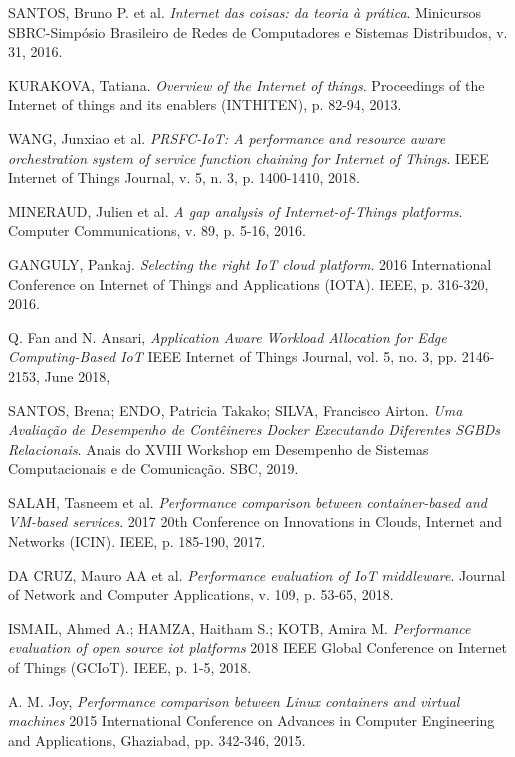 \documentclass{sbrt}
\begin{document}
\begin{thebibliography}{99}
 SANTOS, Bruno P. et al. \textit{Internet das coisas: da teoria à prática}. 
Minicursos SBRC-Simpósio Brasileiro de Redes de Computadores e Sistemas Distribuıdos, v. 31, 2016.

 KURAKOVA, Tatiana. \textit{Overview of the Internet of things}. 
Proceedings of the Internet of things and its enablers (INTHITEN), p. 82-94, 2013.

 WANG, Junxiao et al. \textit{PRSFC-IoT: A performance and resource aware orchestration system of service function chaining for Internet of Things}. 
IEEE Internet of Things Journal, v. 5, n. 3, p. 1400-1410, 2018.

 MINERAUD, Julien et al. \textit{A gap analysis of Internet-of-Things platforms}. 
Computer Communications, v. 89, p. 5-16, 2016.

 GANGULY, Pankaj. \textit{Selecting the right IoT cloud platform}.
2016 International Conference on Internet of Things and Applications (IOTA). IEEE, p. 316-320, 2016.

Q. Fan and N. Ansari, \textit{Application Aware Workload Allocation for Edge Computing-Based IoT} 
IEEE Internet of Things Journal, vol. 5, no. 3, pp. 2146-2153, June 2018, 

 SANTOS, Brena; ENDO, Patricia Takako; SILVA, Francisco Airton. \textit{Uma Avaliação de Desempenho de Contêineres Docker Executando Diferentes SGBDs Relacionais}. 
Anais do XVIII Workshop em Desempenho de Sistemas Computacionais e de Comunicação. SBC, 2019.

 SALAH, Tasneem et al. \textit{Performance comparison between container-based and VM-based services}. 
2017 20th Conference on Innovations in Clouds, Internet and Networks (ICIN). IEEE, p. 185-190, 2017.

 DA CRUZ, Mauro AA et al. \textit{Performance evaluation of IoT middleware}. 
Journal of Network and Computer Applications, v. 109, p. 53-65, 2018.

 ISMAIL, Ahmed A.; HAMZA, Haitham S.; KOTB, Amira M. \textit{Performance evaluation of open source iot platforms} 
2018 IEEE Global Conference on Internet of Things (GCIoT). IEEE,  p. 1-5, 2018.

 A. M. Joy, \textit{Performance comparison between Linux containers and virtual machines}
2015 International Conference on Advances in Computer Engineering and Applications, Ghaziabad, pp. 342-346, 2015.


\end{thebibliography}
\end{document}
